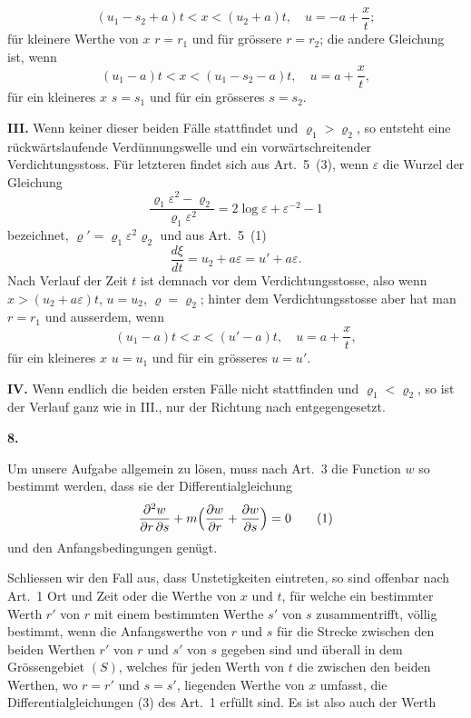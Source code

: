 \documentclass[12pt,a4paper]{article}
\begin{document}
\[
(u_{1} - s_{2} + a)t < x < (u_{2} + a)t,\quad u = -a + \frac{x}{t};
\]
f\"ur kleinere Werthe von $x$ $r = r_{1}$ und f\"ur gr\"ossere $r = r_{2}$; die andere Gleichung ist, wenn
\[
(u_{1} - a)t < x < (u_{1} - s_{2} - a)t,\quad u = a + \frac{x}{t},
\]
f\"ur ein kleineres $x$ $s = s_{1}$ und f\"ur ein gr\"osseres $s = s_{2}$.

\smallskip
\noindent\textbf{III.} Wenn keiner dieser beiden F\"alle stattfindet und $\varrho_{1} > \varrho_{2}$, so entsteht eine r\"uckw\"artslaufende Verd\"unnungswelle und ein vorw\"artschreitender Verdichtungsstoss. F\"ur letzteren findet sich aus Art.~5~(3), wenn $\varepsilon$ die Wurzel der Gleichung
\[
\frac{\varrho_{1}\varepsilon^{2} - \varrho_{2}}{\varrho_{1}\varepsilon^{2}} = 2\log\varepsilon + \varepsilon^{-2} - 1
\]
bezeichnet, $\varrho' = \varrho_{1}\varepsilon^{2}\varrho_{2}$ und aus Art.~5~(1)
\[
\frac{d\xi}{dt} = u_{2} + a\varepsilon = u' + a\varepsilon.
\]
Nach Verlauf der Zeit $t$ ist demnach vor dem Verdichtungsstosse, also wenn $x > (u_{2} + a\varepsilon)t$, $u = u_{2}$, $\varrho = \varrho_{2}$; hinter dem Verdichtungsstosse aber hat man $r = r_{1}$ und ausserdem, wenn
\[
(u_{1} - a)t < x < (u' - a)t,\quad u = a + \frac{x}{t},
\]
f\"ur ein kleineres $x$ $u = u_{1}$ und f\"ur ein gr\"osseres $u = u'$.

\smallskip
\noindent\textbf{IV.} Wenn endlich die beiden ersten F\"alle nicht stattfinden und $\varrho_{1} < \varrho_{2}$, so ist der Verlauf ganz wie in III., nur der Richtung nach entgegengesetzt.

\newpage
\begin{center}
\textbf{8.}
\end{center}

Um unsere Aufgabe allgemein zu l\"osen, muss nach Art.~3 die Function $w$ so bestimmt werden, dass sie der Differentialgleichung
\begin{equation*}
\frac{\partial^{2}w}{\partial r\,\partial s} + m\Bigl(\frac{\partial w}{\partial r} + \frac{\partial w}{\partial s}\Bigr) = 0\tag{1}
\end{equation*}
und den Anfangsbedingungen gen\"ugt.

Schliessen wir den Fall aus, dass Unstetigkeiten eintreten, so sind offenbar nach Art.~1 Ort und Zeit oder die Werthe von $x$ und $t$, f\"ur welche ein bestimmter Werth $r'$ von $r$ mit einem bestimmten Werthe $s'$ von $s$ zusammentrifft, v\"ollig bestimmt, wenn die Anfangswerthe von $r$ und $s$ f\"ur die Strecke zwischen den beiden Werthen $r'$ von $r$ und $s'$ von $s$ gegeben sind und \"uberall in dem Gr\"ossengebiet $(S)$, welches f\"ur jeden Werth von $t$ die zwischen den beiden Werthen, wo $r = r'$ und $s = s'$, liegenden Werthe von $x$ umfasst, die Differentialgleichungen (3) des Art.~1 erf\"ullt sind. Es ist also auch der Werth
\end{document}
